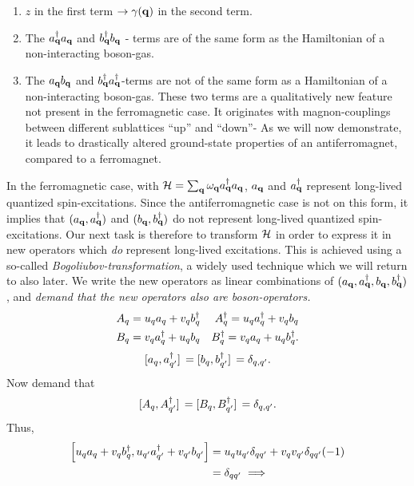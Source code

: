 \begin{enumerate}
	\item $z$ in the first term $\rightarrow \gamma(\vb{q})$ in the second term.
	\item The $a_{\vb{q}}^{\dagger}a_{\vb{q}}$ and $b_{\vb{q}}^{\dagger}b_{\vb{q}}$ - terms are of the same form as the Hamiltonian of a non-interacting boson-gas. 
	\item The $a_{\vb{q}}b_{\vb{q}}$ and $ b_{\vb{q}}^{\dagger}a_{\vb{q}}^{\dagger}$-terms are not of the same form as a Hamiltonian of a non-interacting boson-gas. These two terms are a qualitatively new feature not present in the ferromagnetic case. It originates with magnon-couplings between different sublattices ``up'' and ``down''- As we will now demonstrate, it leads to drastically altered ground-state properties of an antiferromagnet, compared to a ferromagnet. 
\end{enumerate}
In the ferromagnetic case, with $\mathcal{H} = \sum_{\vb{q}}\omega_{\vb{q}} a_{\vb{q}}^{\dagger} a_{\vb{q}}$, $a_{\vb{q}}$ and $a_{\vb{q}}^{\dagger}$ represent long-lived quantized spin-excitations. Since the antiferromagnetic case is not on this form, it implies that $(a_{\vb{q}},a_{\vb{q}}^{\dagger})$ and $(b_{\vb{q}},b_{\vb{q}}^{\dagger})$ do not represent long-lived quantized spin-excitations. Our next task is therefore to transform $\mathcal{H}$ in order to express it in new operators which \emph{do} represent long-lived excitations.
This is achieved using a so-called \emph{Bogoliubov-transformation}, a widely used technique which we will return to also later. We write the new operators as linear combinations of $(a_{\vb{q}},a_{\vb{q}}^{\dagger},b_{\vb{q}},b_{\vb{q}}^{\dagger})$, and \emph{demand that the new operators also are boson-operators.}
\begin{align}
	A_{q} = u_{q}a_{q} + v_{q}b_{q}^{\dagger} && 	A_{q}^{\dagger} = u_{q}a_{q}^{\dagger} + v_{q}b_{q}\\
	 B_{q} = v_{q}a_{q}^{\dagger} + u_{q}b_{q} && 	 B_{q}^{\dagger} = v_{q}a_{q}+ u_{q}b_{q}^{\dagger}.
\end{align}
\begin{equation}
	\comm*{a_{q}}{a_{q'}^{\dg}} = \comm*{b_{q}}{b_{q'}^{\dg}} = \delta_{q,q'}.
\end{equation}
Now demand that 
\begin{equation}
	\comm*{A_{q}}{A_{q'}^{\dg}} = \comm*{B_{q}}{B_{q'}^{\dg}} = \delta_{q,q'}.
\end{equation}
Thus,
\begin{align*}
	\comm{u_{q}a_{q} + v_{q}b_{q}^{\dg}}{u_{q'}a_{q'}^{\dg} + v_{q'}b_{q'}} &= u_{q}u_{q'}\delta_{qq'} + v_{q}v_{q'}\delta_{qq'}(-1)\\
	&= \delta_{qq'}
\implies	
\end{align*}
